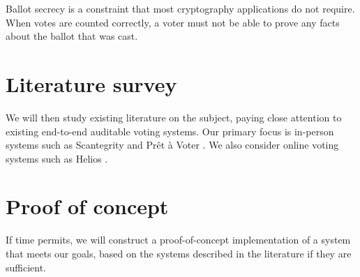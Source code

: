\documentclass[10pt]{article}
\begin{document}
\begin{multicols}{2}
Ballot secrecy is a constraint that most cryptography applications do not require.
When votes are counted correctly, a voter must not be able to prove any
facts about the ballot that was cast.

\section{Literature survey}

We will then study existing literature on the subject, paying close attention to existing
end-to-end auditable voting systems.
Our primary focus is in-person systems such as Scantegrity \cite{scantegrity} and
Pr\^{e}t \`{a} Voter \cite{preta}.
We also consider online voting systems such as Helios \cite{helios}.

\section{Proof of concept}

If time permits, we will construct a proof-of-concept implementation of a system that meets
our goals, based on the systems described in the literature if they are sufficient.

{}


\end{multicols}
\end{document}
